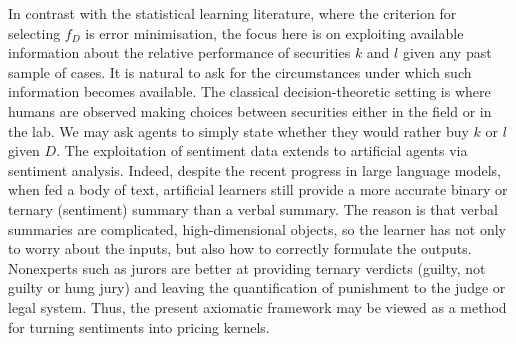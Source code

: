 \documentclass[12pt,a4paper,twoside]{article}
\newcommand{\relations}{\operatorname{rel}}
\newcommand{\novel}{\mathfrak f}
\newcommand{\precb}{\mathbin{\prec}}
\newcommand{\preceqb}{\mathbin{\preceq}}
\newcommand{\mbbd}{{\mathds D}}
\newcommand{\mbbdp}{{\mathds D^{\novel}}}
\begin{document}
In contrast with the statistical learning literature, where the criterion for
selecting $f_D$ is error minimisation, the focus here is on exploiting
available information about the relative performance of securities $k$ and $l$
given any past sample of cases. It is natural to ask for the circumstances
under which such information becomes available. The classical
decision-theoretic setting is where humans are observed making choices between
securities either in the field or in the lab. We may ask agents to simply state
whether they would rather buy $k$ or $l$ given $D$. The exploitation of
sentiment data extends to artificial agents via sentiment analysis. Indeed,
despite the recent progress in large language models, when fed a body of text,
artificial learners still provide a more accurate binary or ternary (sentiment)
summary than a verbal summary. The reason is that verbal summaries are
complicated, high-dimensional objects, so the learner has not only to worry
about the inputs, but also how to correctly formulate the outputs.  Nonexperts
such as jurors are better at providing ternary verdicts (guilty, not guilty or
hung jury) and leaving the quantification of punishment to the judge or legal
system.  Thus, the present axiomatic framework may be viewed as a method for
turning sentiments into pricing kernels.





\end{document}
